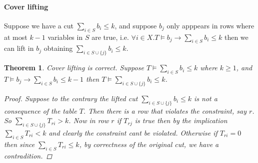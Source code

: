 \documentclass{article}
\newtheorem{theorem}{Theorem}
\newcounter{excount}
\newenvironment{example}{\begin{quote}\refstepcounter{excount}\textbf{Example~\arabic{excount}:}}{\hfill$\qed$\end{quote}}
\newcommand{\ignore}[1]{}
\begin{document}
\ignore{
\paragraph{Clique lifting}

Suppose we have a cut $\sum_{i \in S} b_i \leq k$,
and suppose $b_j$ is such that
$\forall i \in X. T \models \neg b_i \vee \neg b_j$. i.e., $i$ and $j$ are never true in any row in $T$, then we can lift in $b_j$ obtaining
$\sum_{i \in S \cup \{j\}} b_i \leq k$.

\begin{example}\label{ex:lift}
Consider the problem of Example~\ref{ex:start}. 
Since we have that $b_4$ and $b_6$ never appear together, and $b_4$ and $b_2$ never appear together we can lift the cut to
$b_2 + b_4 + b_6 \leq 1$.
\end{example}

\begin{theorem}
Clique lifting is correct.
Suppose $T \models \sum_{i \in S} b_i \leq k$ where $k \geq 1$, and $T \models \neg b_i \vee \neg b_j, \forall i \in S$ then
$T \models \sum_{i \in S \cup \{j\}} b_i \leq k$.
\begin{proof}
Suppose to the contrary the lifted cut $\sum_{i \in S \cup \{j\}} b_i \leq k$ 
is not a consequence of the table $T$.
Then there is a row that violates the constraint, say $r$.  
So $\sum_{i \in S \cup \{j\}} T_{ri} > k$. Now in row $r$ if $T_{rj}$ is true then none of $T_{ri}, i \in S$ are true, and clearly the constraint cant be violated. Otherwise if $T_{ri} = 0$ then since $\sum_{i \in S}T_{ri} \leq k$, by correctness of the original cut, we have a contradition.
\end{proof}
\end{theorem}
}

\paragraph{Cover lifting}
Suppose we have a cut $\sum_{i \in S} b_i \leq k$,
and suppose $b_j$ only apppears in rows where at most $k-1$ variables
in $S$ are true, i.e.
$\forall i \in X. T \models b_j \rightarrow \sum_{i \in S} b_i \leq k$ then we can lift in $b_j$ obtaining
$\sum_{i \in S \cup \{j\}} b_i \leq k$.

\begin{theorem}
Cover lifting is correct.
Suppose $T \models \sum_{i \in S} b_i \leq k$ where $k \geq 1$, and $T \models b_j \rightarrow \sum_{i \in S} b_i \leq k-1$ then
$T \models \sum_{i \in S \cup \{j\}} b_i \leq k$.
\begin{proof}
Suppose to the contrary the lifted cut $\sum_{i \in S \cup \{j\}} b_i \leq k$ 
is not a consequence of the table $T$.
Then there is a row that violates the constraint, say $r$.  
So $\sum_{i \in S \cup \{j\}} T_{ri} > k$. Now in row $r$ if $T_{rj}$ is true then by the implication
$\sum_{i \in S} T_{ri} <k$ and clearly the constraint cant be violated. Otherwise if $T_{ri} = 0$ then since $\sum_{i \in S} T_{ri} \leq k$, by correctness of the original cut, we have a contradition.
\end{proof}
\end{theorem}
\end{document}
